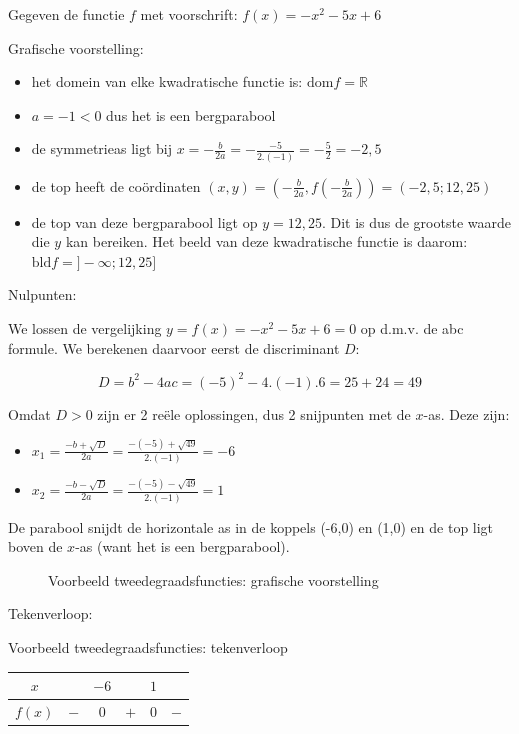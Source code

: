 \begin{voorbeeld}
	Gegeven de functie $f$ met voorschrift: $f(x)=-x^{2}-5x+6$ 

Grafische voorstelling:
\begin{itemize}
\item het domein van elke kwadratische functie is: $\textrm{dom}f=\mathbb{R}$
\item $a=-1<0$ dus het is een bergparabool
\item de symmetrieas ligt bij $x=-\frac{b}{2a}=-\frac{-5}{2.(-1)}=-\frac{5}{2}=-2,5$
\item de top heeft de co\"ordinaten $(x,y)=(-\frac{b}{2a},f(-\frac{b}{2a}))=(-2,5;12,25)$
\item de top van deze bergparabool ligt op $y=12,25$. Dit is dus de grootste
waarde die $y$ kan bereiken. Het beeld van deze kwadratische functie
is daarom: $\textrm{bld}f=]-\infty;12,25]$
\end{itemize}


Nulpunten:

We lossen de vergelijking $y=f(x)=-x^{2}-5x+6=0$ op d.m.v.
de abc formule. We berekenen daarvoor eerst de discriminant $D$:

\begin{equation*}
D=b^{2}-4ac=(-5)^{2}-4.(-1).6=25+24=49
\end{equation*}

Omdat $D>0$ zijn er 2 re\"ele oplossingen, dus 2 snijpunten
met de $x$-as. Deze zijn:
\begin{itemize}
\item $x_{1}=\frac{-b+\sqrt{D}}{2a}=\frac{-(-5)+\sqrt{49}}{2.(-1)}=-6$
\item $x_{2}=\frac{-b-\sqrt{D}}{2a}=\frac{-(-5)-\sqrt{49}}{2.(-1)}=1$
\end{itemize}
De parabool snijdt de horizontale as in de koppels (-6,0) en (1,0)
en de top ligt boven de $x$-as (want het is een bergparabool).

\begin{figure}[H]
\centering

\caption{Voorbeeld tweedegraadsfuncties: grafische voorstelling}
\label{fig:tweede:vb} 
\end{figure}


Tekenverloop:


\begin{tabel}{Voorbeeld tweedegraadsfuncties: tekenverloop}
\begin{tabular}{c||c|c|c|c|c}
	$x$ &  & $-6$ &  & $1$ & \\
	\hline 
	$f(x)$ & $-$ & 0 & $+$ & 0 & $-$\\
\end{tabular}
\label{tab:tweede:vb}	
\end{tabel}

\end{voorbeeld}